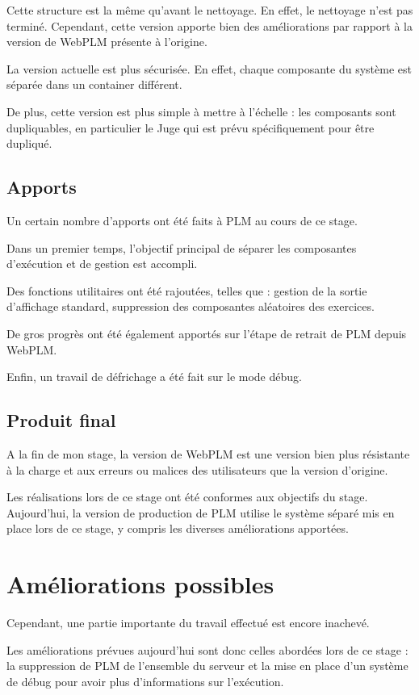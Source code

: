 \documentclass[stage]{tnreport}
\begin{document}
Cette structure est la même qu'avant le nettoyage. En effet, le nettoyage n'est pas terminé. Cependant, cette version apporte bien des améliorations par rapport à la version de WebPLM présente à l'origine.

La version actuelle est plus sécurisée. En effet, chaque composante du système est séparée dans un container différent.

De plus, cette version est plus simple à mettre à l'échelle : les composants sont dupliquables, en particulier le Juge qui est prévu spécifiquement pour être dupliqué.

 \subsection{Apports}

Un certain nombre d'apports ont été faits à PLM au cours de ce stage.

Dans un premier temps, l'objectif principal de séparer les composantes d'exécution et de gestion est accompli.

Des fonctions utilitaires ont été rajoutées, telles que : gestion de la sortie d'affichage standard, suppression des composantes aléatoires des exercices.

De gros progrès ont été également apportés sur l'étape de retrait de PLM depuis WebPLM.

Enfin, un travail de défrichage a été fait sur le mode débug.

\subsection{Produit final}

A la fin de mon stage, la version de WebPLM est une version bien plus résistante à la charge et aux erreurs ou malices des utilisateurs que la version d'origine.

Les réalisations lors de ce stage ont été conformes aux objectifs du stage. Aujourd'hui, la version de production de PLM utilise le système séparé mis en place lors de ce stage, y compris les diverses améliorations apportées.

\section{Améliorations possibles}

Cependant, une partie importante du travail effectué est encore inachevé.

Les améliorations prévues aujourd'hui sont donc celles abordées lors de ce stage : la suppression de PLM de l'ensemble du serveur et la mise en place d'un système de débug pour avoir plus d'informations sur l'exécution.
\end{document}
